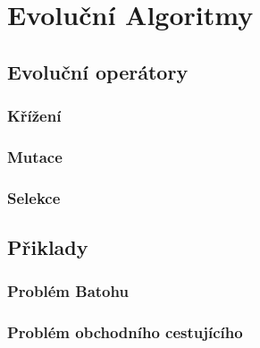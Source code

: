 \chapter{Evoluční Algoritmy}

\section{Evoluční operátory}
\subsection{Křížení}
\subsection{Mutace}
\subsection{Selekce}
\section{Přiklady}
\subsection{Problém Batohu}
\subsection{Problém obchodního cestujícího}
